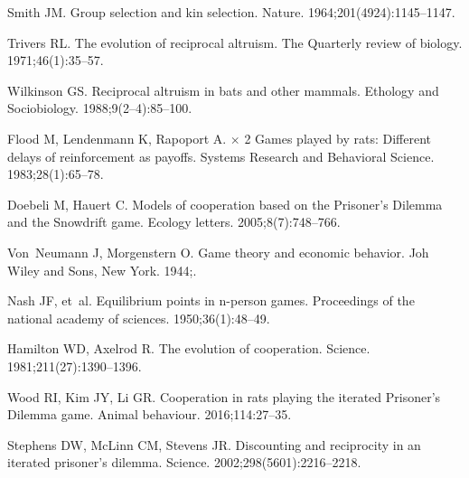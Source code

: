 \documentclass[10pt,letterpaper]{article}
\begin{document}
\nolinenumbers

%
%
% 

%
%

\begin{thebibliography}{10}

Smith JM.
\newblock Group selection and kin selection.
\newblock Nature. 1964;201(4924):1145--1147.

Trivers RL.
\newblock The evolution of reciprocal altruism.
\newblock The Quarterly review of biology. 1971;46(1):35--57.

Wilkinson GS.
\newblock Reciprocal altruism in bats and other mammals.
\newblock Ethology and Sociobiology. 1988;9(2--4):85--100.

Flood M, Lendenmann K, Rapoport A.
$\times$ 2 Games played by rats: Different delays of reinforcement
  as payoffs.
\newblock Systems Research and Behavioral Science. 1983;28(1):65--78.

Doebeli M, Hauert C.
\newblock Models of cooperation based on the Prisoner's Dilemma and the
  Snowdrift game.
\newblock Ecology letters. 2005;8(7):748--766.

Von~Neumann J, Morgenstern O.
\newblock Game theory and economic behavior.
\newblock Joh Wiley and Sons, New York. 1944;.

Nash JF, et~al.
\newblock Equilibrium points in n-person games.
\newblock Proceedings of the national academy of sciences. 1950;36(1):48--49.

Hamilton WD, Axelrod R.
\newblock The evolution of cooperation.
\newblock Science. 1981;211(27):1390--1396.

Wood RI, Kim JY, Li GR.
\newblock Cooperation in rats playing the iterated Prisoner's Dilemma game.
\newblock Animal behaviour. 2016;114:27--35.

Stephens DW, McLinn CM, Stevens JR.
\newblock Discounting and reciprocity in an iterated prisoner's dilemma.
\newblock Science. 2002;298(5601):2216--2218.


\end{thebibliography}
\end{document}
